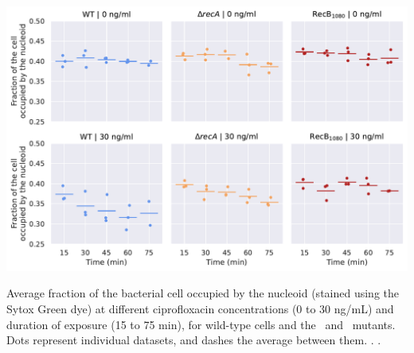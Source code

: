 \begin{suppfigure*}[htbp]
    \begin{center}
    \includegraphics[width=.8\textwidth]{SI_Figures/Mutants_nucleoid_compaction.pdf}
    \end{center}
    \caption{Average fraction of the bacterial cell occupied by the nucleoid (stained using the Sytox Green dye) at different ciprofloxacin concentrations (0 to 30 ng/mL) and duration of exposure (15 to 75 min), for wild-type cells and the \dreca\ and \teneighty\ mutants. Dots represent individual datasets, and dashes the average between them. . .}
    \label{SIFig:mutants_nucleoid_compaction}
\end{suppfigure*}
